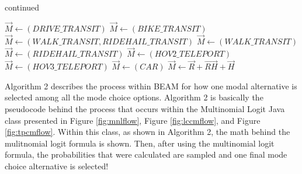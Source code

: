 \documentclass[3p, authoryear, review]{elsarticle} %
\begin{document}
\addtocounter{algorithm}{-1}
\begin{algorithm}
\caption{continued}
\begin{algorithmic} [1]
      \State $\vec{M} \gets (DRIVE\_TRANSIT)$
    \Else
      \State $\vec{M} \gets (BIKE\_TRANSIT)$
    \EndIf  
  \Else
    \State $\vec{M} \gets (WALK\_TRANSIT, RIDEHAIL\_TRANSIT)$
  \EndIf
{}  
    \State $\vec{M} \gets (WALK\_TRANSIT)$
  \Else
    \State $\vec{M} \gets (RIDEHAIL\_TRANSIT)$
  \EndIf
{}  
    \State $\vec{M} \gets (HOV2\_TELEPORT)$
  \Else
    \State $\vec{M} \gets (HOV3\_TELEPORT)$
  \EndIf
{}
  \State $\vec{M} \gets (CAR)$
\Else
  \State $\vec{M} \gets \vec{R} + \vec{RH} + \vec{H}$  
\EndIf  
\EndProcedure
\EndFor
\EndFor
\Statex
\end{algorithmic}
\end{algorithm}

Algorithm 2 describes the process within BEAM for how one modal alternative is selected among all the mode choice options. Algorithm 2 is basically the pseudocode behind the process that occurs within the Multinomial Logit Java class presented in Figure \ref{fig:mnlflow}, Figure \ref{fig:lccmflow}, and Figure \ref{fig:tpcmflow}. Within this class, as shown in Algorithm 2, the math behind the mulitnomial logit formula is shown. Then, after using the multinomial logit formula, the probabilities that were calculated are sampled and one final mode choice alternative is selected!
\end{document}

